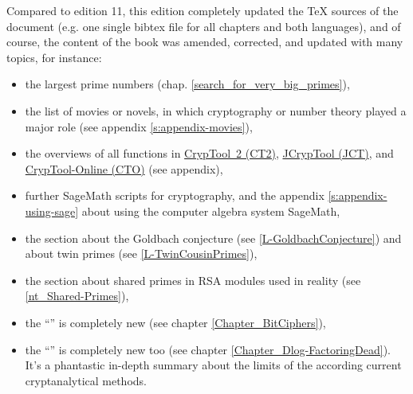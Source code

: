 Compared to edition 11, this edition completely updated the TeX sources
of the document (e.g. one single bibtex file for all chapters and both languages),
and of course, the content of the book was amended, corrected, and
updated with many topics, for instance:
\vspace{-5pt}
\begin{itemize}
  \item the largest prime numbers (chap. \ref{search_for_very_big_primes}),
  \item the list of movies or novels, in which cryptography or number theory 
        played a major role (see appendix \ref{s:appendix-movies}),
  \item the overviews of all functions in
        \hyperlink{appendix-template-overview-CT2}{CrypTool~2 (CT2)},
        \hyperlink{appendix-function-overview-JCT}{JCrypTool (JCT)}, and
        \hyperlink{appendix-function-overview-CTO}{CrypTool-Online (CTO)}
        (see appendix),
  \item further SageMath scripts for cryptography, and the appendix
        \ref{s:appendix-using-sage} about using the computer algebra system
        SageMath,
  \item the section about the Goldbach conjecture
        (see \ref{L-GoldbachConjecture}) and about twin primes
        (see \ref{L-TwinCousinPrimes}),
  \item the section about shared primes in RSA modules used in reality
        (see \ref{nt_Shared-Primes}),
  \item the ``'' is completely new
        (see chapter \ref{Chapter_BitCiphers}),
  \item the ``'' is completely new too
        (see chapter \ref{Chapter_Dlog-FactoringDead}). It's a phantastic
	in-depth summary about the limits of the according current
	cryptanalytical methods.
\end{itemize}

